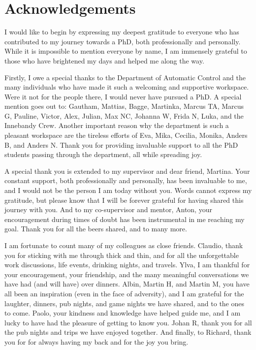 \chapter*{Acknowledgements}
I would like to begin by expressing my deepest gratitude to everyone who has contributed to my journey towards a PhD, both professionally and personally.
While it is impossible to mention everyone by name, I am immensely grateful to those who have brightened my days and helped me along the way.

Firstly, I owe a special thanks to the Department of Automatic Control and the many individuals who have made it such a welcoming and supportive workspace.
Were it not for the people there, I would never have pursued a PhD.
A special mention goes out to: Gautham, Mattias, Bagge, Martinka, Marcus TA, Marcus G, Pauline, Victor, Alex, Julian, Max NC, Johanna W, Frida N, Luka, and the Innebandy Crew.
Another important reason why the department is such a pleasant workspace are the tireless efforts of Eva, Mika, Cecilia, Monika, Anders B, and Anders N.
Thank you for providing invaluable support to all the PhD students passing through the department, all while spreading joy.

A special thank you is extended to my supervisor and dear friend, Martina.
Your constant support, both professionally and personally, has been invaluable to me, and I would not be the person I am today without you.
Words cannot express my gratitude, but please know that I will be forever grateful for having shared this journey with you.
And to my co-supervisor and mentor, Anton, your encouragement during times of doubt has been instrumental in me reaching my goal.
Thank you for all the beers shared, and to many more.

I am fortunate to count many of my colleagues as close friends.
Claudio, thank you for sticking with me through thick and thin, and for all the unforgettable work discussions, life events, drinking nights, and travels.
Ylva, I am thankful for your encouragement, your friendship, and the many meaningful conversations we have had (and will have) over dinners.
Albin, Martin H, and Martin M, you have all been an inspiration (even in the face of adversity), and I am grateful for the laughter, dinners, pub nights, and game nights we have shared, and to the ones to come.
Paolo, your kindness and knowledge have helped guide me, and I am lucky to have had the pleasure of getting to know you.
Johan R, thank you for all the pub nights and trips we have enjoyed together.
And finally, to Richard, thank you for for always having my back and for the joy you bring.

